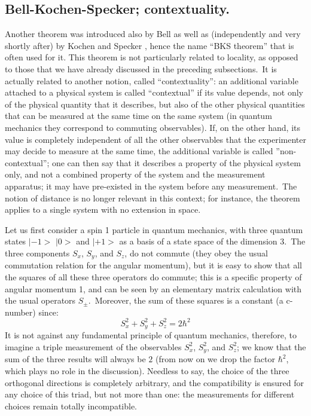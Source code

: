 \documentclass[12pt,onecolumn]{article}%
\begin{document}
\subsection{Bell-Kochen-Specker; contextuality.}

\label{BKS}

Another theorem was introduced also by Bell \cite{Bell-1} as well as
(independently and very shortly after) by Kochen and Specker
\cite{Kochen-Specker}, hence the name ``BKS theorem'' that is often used for
it. This theorem is not particularly related to locality, as opposed to those
that we have already discussed in the preceding subsections.\ It is actually
related to another notion, called ``contextuality'': an additional variable
attached to a physical system is called ``contextual'' if its value depends,
not only of the physical quantity that it describes, but also of the other
physical quantities that can be measured at the same time on the same system
(in quantum mechanics they correspond to commuting observables). If, on the
other hand, its value is completely independent of all the other observables
that the experimenter may decide to measure at the same time, the additional
variable is called ''non-contextual''; one can then say that it describes a
property of the physical system only, and not a combined property of the
system and the measurement apparatus; it may have pre-existed in the system
before any measurement.\ The notion of distance is no longer relevant in this
context; for instance, the theorem applies to a single system with no
extension in space.

Let us first consider a spin 1 particle in quantum mechanics, with three
quantum states $|-1>$ $|0>$ and $|+1>$ as a basis of a state space of
the dimension 3.\ The three components $S_{x}$, $S_{y}$, and $S_{z}$, do not
commute (they obey the usual commutation relation for the angular momentum),
but it is easy to show that all the squares of all these three operators do
commute; this is a specific property of angular momentum 1, and can be seen by
an elementary matrix calculation with the usual operators $S_{\pm}%
$.\ Moreover, the sum of these squares is a constant (a c-number) since:%
\begin{equation}
S_{x}^{2}+S_{y}^{2}+S_{z}^{2}=2\hbar^{2} \label{12}%
\end{equation}
It is not against any fundamental principle of quantum mechanics, therefore,
to imagine a triple measurement of the observables $S_{x}^{2}$, $S_{y}^{2}$,
and $S_{z}^{2}$; we know that the sum of the three results will always be $2$
(from now on we drop the factor $\hbar^{2}$, which plays no role in the
discussion). Needless to say, the choice of the three orthogonal directions is
completely arbitrary, and the compatibility is ensured for any choice of this
triad, but not more than one: the measurements for different choices remain
totally incompatible.
\end{document}
